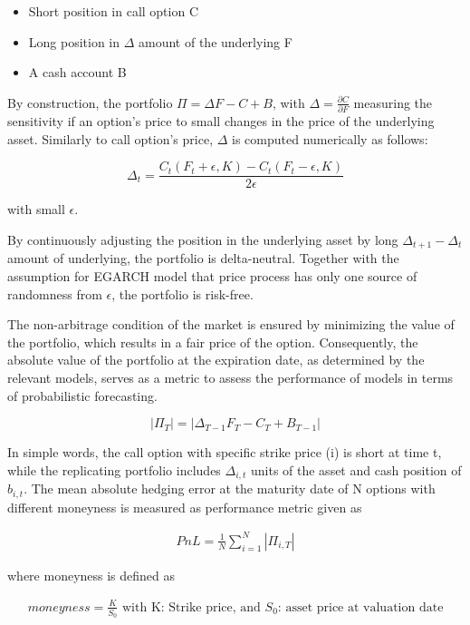 \documentclass[12pt,a4paper]{article}
\numberwithin{equation}{section}
\begin{document}
\begin{itemize}
\item Short position in call option C
\item Long position in $\Delta$ amount of the underlying F
\item A cash account B
\end{itemize}

By construction, the portfolio $\Pi = \Delta F - C + B$, with $\Delta = \frac{\partial C}{\partial F}$ measuring the sensitivity if an option's price to small changes in the price of the underlying asset. Similarly to call option's price, $\Delta$ is computed numerically as follows:

\[\Delta_t = \frac{C_t(F_t+\epsilon, K) - C_t(F_t - \epsilon, K)}{2\epsilon}\] 

with small $\epsilon$.

By continuously adjusting the position in the underlying asset by long $\Delta_{t+1} - \Delta_t$ amount of underlying, the portfolio is delta-neutral. Together with the assumption for EGARCH model that price process has only one source of randomness from $\epsilon$, the portfolio is risk-free. 

The non-arbitrage condition of the market is ensured by minimizing the value of the portfolio, which results in a fair price of the option. Consequently, the absolute value of the portfolio at the expiration date, as determined by the relevant models, serves as a metric to assess the performance of models in terms of probabilistic forecasting. 

\[|\Pi_T| = |\Delta_{T-1} F_T - C_T + B_{T-1}|\]



In simple words, the call option with specific strike price (i) is short at time t, while the replicating portfolio includes $\Delta _{i,t}$ units of the asset and cash position of $b_{i,t}$. The mean absolute hedging error at the maturity date of N options with different moneyness is measured as performance metric given as

\begin{align*}
PnL = \frac{1}{N} \sum_{i = 1}^{N} |\Pi_{i,T}|
\end{align*}

where moneyness is defined as 

\begin{align*}
moneyness = \frac{K}{S_0} \text{ with K: Strike price, and $S_0$: asset price at valuation date}
\end{align*}
\end{document}
